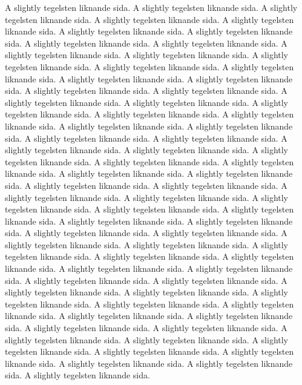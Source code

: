 \documentclass[cropmarks, frame, english]{idamasterthesis}
\begin{document}
A slightly tegelsten liknande sida. 
A slightly tegelsten liknande sida. 
A slightly tegelsten liknande sida. 
A slightly tegelsten liknande sida. 
A slightly tegelsten liknande sida. 
A slightly tegelsten liknande sida. 
A slightly tegelsten liknande sida. 
A slightly tegelsten liknande sida. 
A slightly tegelsten liknande sida. 
A slightly tegelsten liknande sida. 
A slightly tegelsten liknande sida. 
A slightly tegelsten liknande sida. 
A slightly tegelsten liknande sida. 
A slightly tegelsten liknande sida. 
A slightly tegelsten liknande sida. 
A slightly tegelsten liknande sida. 
A slightly tegelsten liknande sida. 
A slightly tegelsten liknande sida. 
A slightly tegelsten liknande sida. 
A slightly tegelsten liknande sida. 
A slightly tegelsten liknande sida. 
A slightly tegelsten liknande sida. 
A slightly tegelsten liknande sida. 
A slightly tegelsten liknande sida. 
A slightly tegelsten liknande sida. 
A slightly tegelsten liknande sida. 
A slightly tegelsten liknande sida. 
A slightly tegelsten liknande sida. 
A slightly tegelsten liknande sida. 
A slightly tegelsten liknande sida. 
A slightly tegelsten liknande sida. 
A slightly tegelsten liknande sida. 
A slightly tegelsten liknande sida. 
A slightly tegelsten liknande sida. 
A slightly tegelsten liknande sida. 
A slightly tegelsten liknande sida. 
A slightly tegelsten liknande sida. 
A slightly tegelsten liknande sida. 
A slightly tegelsten liknande sida. 
A slightly tegelsten liknande sida. 
A slightly tegelsten liknande sida. 
A slightly tegelsten liknande sida. 
A slightly tegelsten liknande sida. 
A slightly tegelsten liknande sida. 
A slightly tegelsten liknande sida. 
A slightly tegelsten liknande sida. 
A slightly tegelsten liknande sida. 
A slightly tegelsten liknande sida. 
A slightly tegelsten liknande sida. 
A slightly tegelsten liknande sida. 
A slightly tegelsten liknande sida. 
A slightly tegelsten liknande sida. 
A slightly tegelsten liknande sida. 
A slightly tegelsten liknande sida. 
A slightly tegelsten liknande sida. 
A slightly tegelsten liknande sida. 
A slightly tegelsten liknande sida. 
A slightly tegelsten liknande sida. 
A slightly tegelsten liknande sida. 
A slightly tegelsten liknande sida. 
A slightly tegelsten liknande sida. 
A slightly tegelsten liknande sida. 
A slightly tegelsten liknande sida. 
A slightly tegelsten liknande sida. 
A slightly tegelsten liknande sida. 
A slightly tegelsten liknande sida. 
A slightly tegelsten liknande sida. 
A slightly tegelsten liknande sida. 
A slightly tegelsten liknande sida. 
A slightly tegelsten liknande sida. 
A slightly tegelsten liknande sida. 
\end{document}
